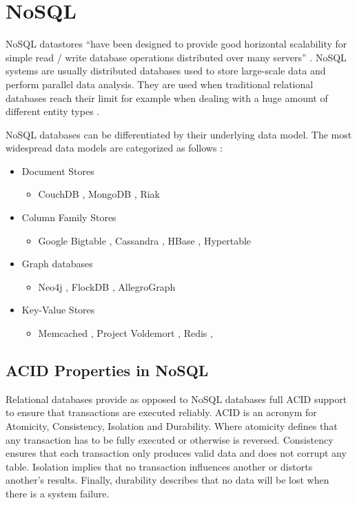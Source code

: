 \section{NoSQL}
\label{sec:nosql}
\acf{NoSQL} datastores \enquote{have been designed to provide good horizontal scalability for simple read / write database operations distributed over many servers} \cite[1]{cattell.2011}. \ac{NoSQL} systems are usually distributed databases used to store large-scale data and perform parallel data analysis. They are used when traditional relational databases reach their limit for example when dealing with a huge amount of different entity types \cite[2 - 3]{orend.2010}.

NoSQL databases can be differentiated by their underlying data model. The most widespread data models are categorized as follows \cite[34]{ellis.2010} \cite[2 - 3]{hecht.2011}:

\begin{itemize}
  \item Document Stores
    \begin{itemize}
      \item CouchDB \cite{couch.2014}, MongoDB \cite{mongo.2014}, Riak \cite{riak.2014}
    \end{itemize}
  \item Column Family Stores
    \begin{itemize}
      \item Google Bigtable \cite{chang.2006}, Cassandra \cite{cassandra.2014}, HBase \cite{hbase.2014}, Hypertable \cite{hypertable.2014}
    \end{itemize}
  \item Graph databases
    \begin{itemize}
      \item Neo4j \cite{neo4j.2014}, FlockDB \cite{flock.2010}, AllegroGraph \cite{allegro.2014}
    \end{itemize}
  \item Key-Value Stores
    \begin{itemize}
      \item Memcached \cite{memcached.2014}, Project Voldemort \cite{voldemort.2013}, Redis \cite{redis.2014},
    \end{itemize}
\end{itemize}

\subsection{ACID Properties in NoSQL}
\label{subsec:acid}
Relational databases provide as opposed to \ac{NoSQL} databases full ACID support to ensure that transactions are executed reliably. ACID is an acronym for Atomicity, Consistency, Isolation and Durability. Where atomicity defines that any transaction has to be fully executed or otherwise is reversed. Consistency ensures that each transaction only produces valid data and does not corrupt any table. Isolation implies that no transaction influences another or distorts another's results. Finally, durability describes that no data will be lost when there is a system failure. \cite[71]{pokorny.2011}

